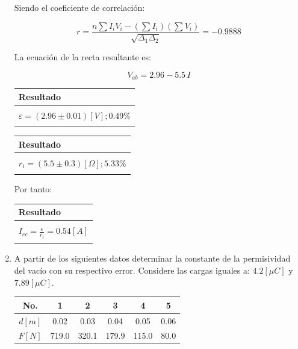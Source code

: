 \documentclass[letter,11pt]{article}
\begin{document}
\begin{enumerate}
    Siendo el coeficiente de correlación:

    \begin{equation*}
        r = \frac{n \sum I_i V_i - (\sum I_i)(\sum V_i)}{\sqrt{\Delta_1 \Delta_2}} = -0.9888
    \end{equation*}

    La ecuación de la recta resultante es:

    \begin{equation*}
        V_{ab} = 2.96 - 5.5\, I
    \end{equation*}

    \begin{center}
    \begin{tabular}{|>{\centering}m{11.0cm}<{\centering}|}
    \hline
    \textbf{Resultado}
    \tabularnewline \hline
    \\
    $\varepsilon = (2.96 \pm 0.01) [V]; 0.49 \%$ \tabularnewline
    \\
    \hline
    \end{tabular}
    \end{center}

    \begin{center}
    \begin{tabular}{|>{\centering}m{11.0cm}<{\centering}|}
    \hline
    \textbf{Resultado}
    \tabularnewline \hline
    \\
    $r_i = (5.5 \pm 0.3) [\Omega]; 5.33 \%$ \tabularnewline
    \\
    \hline
    \end{tabular}
    \end{center}

    Por tanto:

    \begin{center}
    \begin{tabular}{|>{\centering}m{11.0cm}<{\centering}|}
    \hline
    \textbf{Resultado}
    \tabularnewline \hline
    \\
    $I_{cc} = \frac{\epsilon}{r_i} = 0.54 [A]$ \tabularnewline
    \\
    \hline
    \end{tabular}
    \end{center}

\newpage
\item A partir de los siguientes datos determinar la constante de la
    permisividad del vacío con su respectivo error. Considere las cargas iguales
    a: $4.2 [\mu C]$ y $7.89 [\mu C]$.

    \begin{center}
    \begin{tabular}{|c|c|c|c|c|c|}
    \hline
    No. & 1 & 2 & 3 & 4 & 5 \tabularnewline \hline
    $d[m]$ & 0.02 & 0.03 & 0.04 & 0.05 & 0.06 \tabularnewline \hline
    $F[N]$ & 719.0 & 320.1 & 179.9 & 115.0 & 80.0 \tabularnewline \hline
    \end{tabular}
    \end{center}


\end{enumerate}
\end{document}

